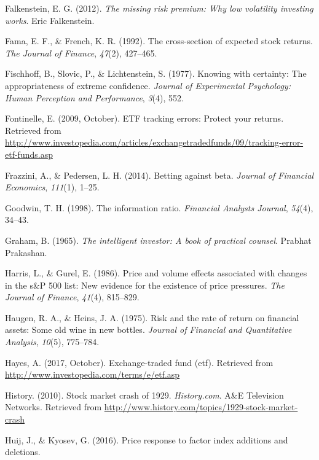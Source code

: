 \documentclass[12pt,twoside]{reedthesis}
\theoremstyle{definition}
\theoremstyle{definition}
\theoremstyle{definition}
\theoremstyle{remark}
\begin{document}
\hypertarget{ref-falkenstein2012}{}
Falkenstein, E. G. (2012). \emph{The missing risk premium: Why low
volatility investing works}. Eric Falkenstein.

\hypertarget{ref-fama1992}{}
Fama, E. F., \& French, K. R. (1992). The cross-section of expected
stock returns. \emph{The Journal of Finance}, \emph{47}(2), 427--465.

\hypertarget{ref-fischhoff1977}{}
Fischhoff, B., Slovic, P., \& Lichtenstein, S. (1977). Knowing with
certainty: The appropriateness of extreme confidence. \emph{Journal of
Experimental Psychology: Human Perception and Performance}, \emph{3}(4),
552.

\hypertarget{ref-fontinelle2009}{}
Fontinelle, E. (2009, October). ETF tracking errors: Protect your
returns. Retrieved from
\url{http://www.investopedia.com/articles/exchangetradedfunds/09/tracking-error-etf-funds.asp}

\hypertarget{ref-frazzini2014}{}
Frazzini, A., \& Pedersen, L. H. (2014). Betting against beta.
\emph{Journal of Financial Economics}, \emph{111}(1), 1--25.

\hypertarget{ref-goodwin1998}{}
Goodwin, T. H. (1998). The information ratio. \emph{Financial Analysts
Journal}, \emph{54}(4), 34--43.

\hypertarget{ref-graham1965}{}
Graham, B. (1965). \emph{The intelligent investor: A book of practical
counsel}. Prabhat Prakashan.

\hypertarget{ref-harris1986}{}
Harris, L., \& Gurel, E. (1986). Price and volume effects associated
with changes in the s\&P 500 list: New evidence for the existence of
price pressures. \emph{The Journal of Finance}, \emph{41}(4), 815--829.

\hypertarget{ref-haugen1975}{}
Haugen, R. A., \& Heins, J. A. (1975). Risk and the rate of return on
financial assets: Some old wine in new bottles. \emph{Journal of
Financial and Quantitative Analysis}, \emph{10}(5), 775--784.

\hypertarget{ref-hayes2017}{}
Hayes, A. (2017, October). Exchange-traded fund (etf). Retrieved from
\url{http://www.investopedia.com/terms/e/etf.asp}

\hypertarget{ref-history2010}{}
History. (2010). Stock market crash of 1929. \emph{History.com}. A\&E
Television Networks. Retrieved from
\url{http://www.history.com/topics/1929-stock-market-crash}

\hypertarget{ref-huij2016}{}
Huij, J., \& Kyosev, G. (2016). Price response to factor index additions
and deletions.
\end{document}
